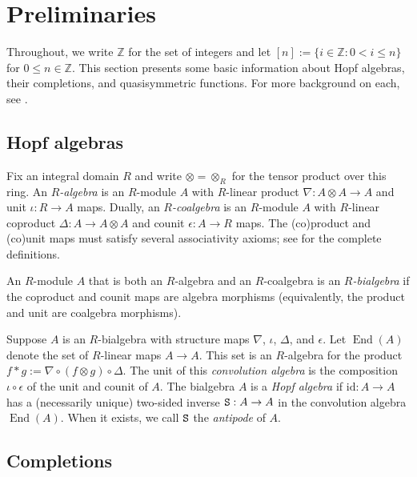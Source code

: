 \documentclass[11pt]{article}
\theoremstyle{definition}
\numberwithin{equation}{section}
\numberwithin{equation}{section}
\newcommand{\End}{\operatorname{End}}
\newcommand{\ZZ}{\mathbb{Z}}
\newcommand{\id}{\mathrm{id}}
\newcommand{\antipode}{{\tt S}}
\newcommand{\defn}[1]{{\color{darkred}\emph{#1}}}
\begin{document}
 

 

\section{Preliminaries}\label{prelim-sect}

Throughout, we write $\ZZ$ for the set of integers
and let $[n] := \{i \in \ZZ : 0<i \leq n\}$ for $0\leq n \in \ZZ$.
This section presents some basic information about Hopf algebras, their completions,
and quasisymmetric functions.
For more background on each, see \cite{GrinbergReiner,LMW,Marberg2018}.

\subsection{Hopf algebras}

Fix an integral domain $R$ and write $\otimes = \otimes_R$ for the tensor product over this ring.
An \defn{$R$-algebra} is an $R$-module $A$ with $R$-linear
product $\nabla : A\otimes A \to A$
and unit $\iota : R\to A$ 
maps.
Dually, an \defn{$R$-coalgebra} is an $R$-module $A$ with $R$-linear 
coproduct $\Delta : A \to A\otimes A$
and 
counit $\epsilon : A \to R$ maps.
 The (co)product and (co)unit maps must satisfy several associativity axioms;
see \cite[\S1]{GrinbergReiner} for the complete definitions.


An $R$-module $A$ that is both an $R$-algebra and an $R$-coalgebra is an \defn{$R$-bialgebra}
if the coproduct and counit maps are algebra morphisms (equivalently, the product and unit are coalgebra morphisms).

Suppose $A$ is an $R$-bialgebra with structure maps $\nabla$, $\iota$, $\Delta$, and $\epsilon$. 
Let $\End(A)$ denote the set of $R$-linear maps $A \to A$. This set is an $R$-algebra for the 
product 
$
f \ast g := \nabla \circ (f\otimes g) \circ \Delta
$. 
The unit of this \defn{convolution algebra}
is the composition $ \iota\circ \epsilon$ of the unit and counit of $A$.
The bialgebra $A$ is a \defn{Hopf algebra} if  $\id : A \to A$ has a
(necessarily unique) two-sided inverse 
$\antipode : A \to A$ in the convolution algebra $\End(A)$. When it exists, we call $\antipode$ the \defn{antipode} of $A$.

\subsection{Completions}\label{completions-sect}
\end{document}
